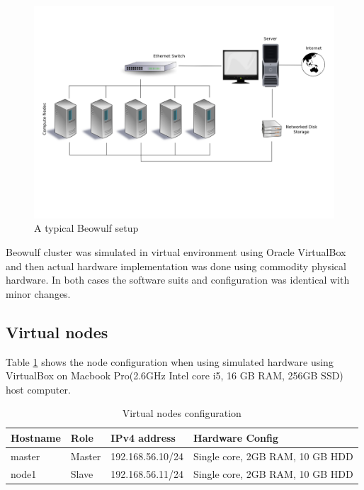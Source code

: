 \begin{figure}[!htb]
  \includegraphics[width=\linewidth]{figs/cluster/beowulf_cluster.png}
  \caption{A typical Beowulf setup}
  \label{fig:beowulf-cluster}
\end{figure}

Beowulf cluster was simulated in virtual environment using Oracle VirtualBox and then actual hardware implementation was done using commodity physical hardware. In both cases the software suits and configuration was identical with minor changes.

\subsection{Virtual nodes}
Table \ref{tab:virt_node_conf} shows the node configuration when using simulated hardware using VirtualBox on Macbook Pro(2.6GHz Intel core i5, 16 GB RAM, 256GB SSD) host computer.

\begin{table}[!htb]
\centering
\caption{Virtual nodes configuration}
\begin{tabular}{|l|l|l|l|}
\hline
Hostname & Role & IPv4 address & Hardware Config \\ \hline
master & Master & 192.168.56.10/24 & Single core, 2GB RAM, 10 GB HDD \\ \hline
node1 & Slave & 192.168.56.11/24 & Single core, 2GB RAM, 10 GB HDD \\ \hline
\end{tabular}
\label{tab:virt_node_conf}
\end{table}

